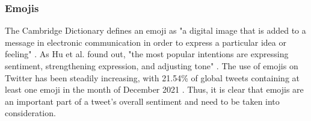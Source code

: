 \subsubsection{Emojis}
The Cambridge Dictionary defines an emoji as "a digital image that is added to a message in electronic communication in order to express a particular idea or feeling" \cite{cambridgeEmoji}. As Hu et al. found out, "the most popular intentions are expressing sentiment, strengthening expression, and adjusting tone" \cite[p.~109]{Hu_Guo_Sun_Nguyen_Luo_2017}. The use of emojis on Twitter has been steadily increasing, with 21.54\% of global tweets containing at least one emoji in the month of December 2021 \cite{emojiStatistic}. Thus, it is clear that emojis are an important part of a tweet's overall sentiment and need to be taken into consideration.







